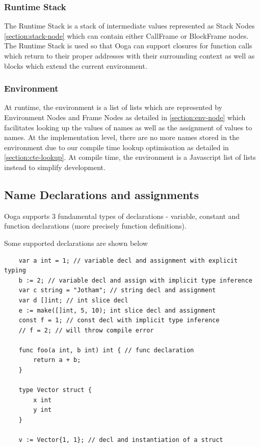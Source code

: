 \documentclass{report}
\begin{document}
\subsubsection{Runtime Stack}

The Runtime Stack is a stack of intermediate values represented as Stack Nodes \ref{section:stack-node} which can contain either CallFrame or BlockFrame nodes. The Runtime Stack is used so that Ooga can support closures for function calls which return to their proper addresses with their surrounding context as well as blocks which extend the current environment.

\subsubsection{Environment}

At runtime, the environment is a list of lists which are represented by Environment Nodes and Frame Nodes as detailed in \ref{section:env-node} which facilitates looking up the values of names as well as the assignment of values to names. At the implementation level, there are no more names stored in the environment due to our compile time lookup optimisation as detailed in \ref{section:cte-lookup}. At compile time, the environment is a Javascript list of lists instead to simplify development.

\subsection{Name Declarations and assignments}

Ooga supports 3 fundamental types of declarations - variable, constant and function declarations (more precisely function definitions).

Some supported declarations are shown below

\begin{verbatim}
    var a int = 1; // variable decl and assignment with explicit typing
    b := 2; // variable decl and assign with implicit type inference
    var c string = "Jotham"; // string decl and assignment
    var d []int; // int slice decl
    e := make([]int, 5, 10); int slice decl and assignment
    const f = 1; // const decl with implicit type inference
    // f = 2; // will throw compile error

    func foo(a int, b int) int { // func declaration
        return a + b;
    }

    type Vector struct {
        x int
        y int
    }

    v := Vector{1, 1}; // decl and instantiation of a struct
\end{verbatim}
\end{document}
